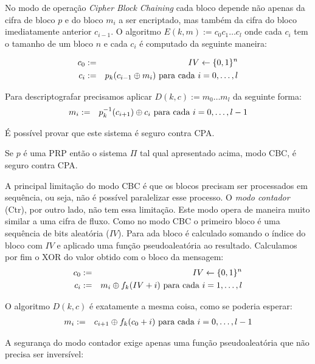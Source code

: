 No modo de operação {\em Cipher Block Chaining} cada bloco depende não apenas da cifra de bloco $p$ e do bloco $m_i$ a ser encriptado, mas também da cifra do bloco imediatamente anterior $c_{i-1}$.
O algoritmo $E(k,m) := c_0 c_1 \dots c_l$ onde cada $c_i$ tem o tamanho de um bloco $n$ e cada $c_i$ é computado da seguinte maneira:

\begin{eqnarray*}
  c_0 & := & IV \leftarrow \{0,1\}^n \\
  c_i & := & p_k(c_{i-1} \oplus m_i) \textrm{ para cada } i = 0, \dots, l
\end{eqnarray*}

Para descriptografar precisamos aplicar $D(k,c) := m_0 \dots m_l$ da seguinte forma:
\begin{eqnarray*}
  m_{i} & := & p_k^{-1}(c_{i+1}) \oplus c_{i} \textrm{ para cada } i = 0, \dots, l-1
\end{eqnarray*}

É possível provar que este sistema é seguro contra CPA.

\begin{theorem}
  Se $p$ é uma PRP então o sistema $\Pi$ tal qual apresentado acima, modo CBC, é seguro contra CPA.
\end{theorem}


A principal limitação do modo CBC é que os blocos precisam ser processados em sequência, ou seja, não é possível paralelizar esse processo.
O {\em modo contador} (Ctr), por outro lado, não tem essa limitação.
Este modo opera de maneira muito similar a uma cifra de fluxo.
Como no modo CBC o primeiro bloco é uma sequência de bits aleatória ($IV$).
Para ada bloco é calculado somando o índice do bloco com $IV$ e aplicado uma função pseudoaleatória ao resultado.
Calculamos por fim o XOR do valor obtido com o bloco da mensagem:
\begin{eqnarray*}
  c_0 & := & IV \leftarrow \{0,1\}^n \\
  c_i & := & m_i \oplus f_k(IV + i) \textrm{ para cada } i = 1, \dots, l
\end{eqnarray*} 

O algoritmo $D(k,c)$ é exatamente a mesma coisa, como se poderia esperar:
\begin{eqnarray*}
  m_i & := & c_{i+1} \oplus f_k(c_0 + i) \textrm{ para cada } i = 0, \dots, l-1
\end{eqnarray*} 

A segurança do modo contador exige apenas uma função pseudoaleatória que não precisa ser inversível:


